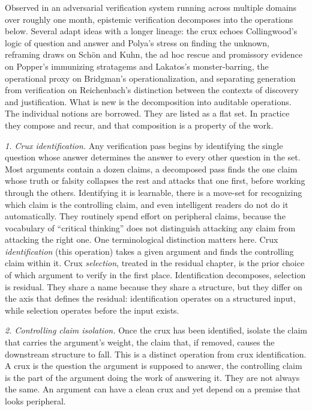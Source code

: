 \documentclass[
  11pt,
]{article}
\begin{document}
Observed in an adversarial verification system running across multiple
domains over roughly one month, epistemic verification decomposes into
the operations below. Several adapt ideas with a longer lineage: the crux echoes Collingwood's logic of question and answer and Polya's stress on finding the unknown, reframing draws on Sch\"on and Kuhn, the ad hoc rescue and promissory evidence on Popper's immunizing stratagems and Lakatos's monster-barring, the operational proxy on Bridgman's operationalization, and separating generation from verification on Reichenbach's distinction between the contexts of discovery and justification. What is new is the decomposition into auditable operations. The individual notions are borrowed. They are listed as a
flat set. In practice they compose and recur, and that composition is a
property of the work.

\emph{1. Crux identification.} Any verification pass begins by
identifying the single question whose answer
determines the answer to every other question in the set. Most arguments
contain a dozen claims, a decomposed pass finds the
one claim whose truth or falsity collapses the rest and attacks that
one first, before working through the others. Identifying it is
learnable, there is a move-set for recognizing which claim is the
controlling claim, and even intelligent readers do not do it automatically.
They routinely spend effort on peripheral claims, because the
vocabulary of ``critical thinking'' does not distinguish attacking
any claim from attacking the right one. One terminological distinction
matters here. Crux \emph{identification} (this operation) takes a
given argument and finds the controlling claim within it. Crux
\emph{selection}, treated in the residual chapter, is the prior choice of which argument
to verify in the first place. Identification decomposes, selection is
residual. They share a name because they share a structure, but they
differ on the axis that defines the residual: identification operates on
a structured input, while selection operates before the input exists.

\emph{2. Controlling claim isolation.} Once the crux has been
identified, isolate the claim that carries the
argument's weight, the claim that, if removed, causes the downstream
structure to fall. This is a distinct operation from crux
identification. A crux is the question the argument is supposed
to answer, the controlling claim is the part of the argument doing
the work of answering it. They are not always the same. An
argument can have a clean crux and yet depend on a premise that
looks peripheral.
\end{document}
